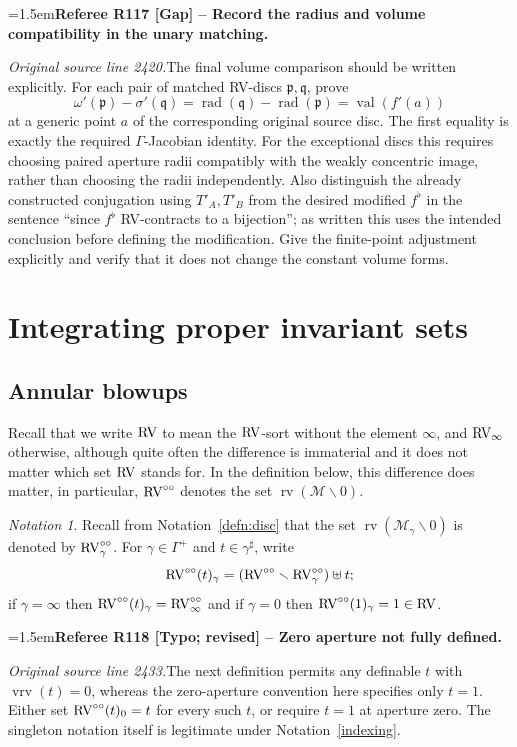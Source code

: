 \documentclass[12pt]{amsart}
\newcommand{\RefereeRemark}[4]{%
  \par\medskip\begingroup\normalfont\small\color{RefereePurple}%
  \emergencystretch=1.5em\noindent\textbf{Referee R#1 [#2] -- #3.}\par\nobreak\noindent #4\par
  \endgroup\medskip
}
\theoremstyle{plain}
\theoremstyle{definition}
\theoremstyle{remark}
\newtheorem{nota}[thm]{Notation}
\numberwithin{equation}{section}
\theoremstyle{plain}
\newcommand{\RV}{\textup{RV}}
\newcommand{\MM}{\mdl M}
\newcommand{\gp}{\mathfrak{p}}
\newcommand{\gq}{\mathfrak{q}}
\newcommand{\0}{\emptyset}
\newcommand{\mdl}[1]{\mathcal{#1}}  %
\newcommand{\mi}{\smallsetminus}
\DeclareMathOperator{\rv}{rv}
\DeclareMathOperator{\vv}{val}
\DeclareMathOperator{\rad}{rad}
\DeclareMathOperator{\vrv}{vrv}
\newcommand{\ccirc}{\circ \circ}
\begin{document}
\RefereeRemark{117}{Gap}{Record the radius and volume compatibility in the unary matching}{%
\textit{Original source line 2420.}\quad The final volume comparison should be written explicitly. For each pair of matched RV-discs $\gp,\gq$, prove
\[
\omega'(\gp)-\sigma'(\gq)
 =\rad(\gq)-\rad(\gp)
 =\vv(f'(a))
\]
at a generic point $a$ of the corresponding original source disc. The first equality is exactly the required $\Gamma$-Jacobian identity. For the exceptional discs this requires choosing paired aperture radii compatibly with the weakly concentric image, rather than choosing the radii independently. Also distinguish the already constructed conjugation using $T'_A,T'_B$ from the desired modified $f^\flat$ in the sentence ``since $f^\flat$ RV-contracts to a bijection''; as written this uses the intended conclusion before defining the modification. Give the finite-point adjustment explicitly and verify that it does not change the constant volume forms.
}

\section{Integrating proper invariant sets}
\label{section:int}

\subsection{Annular blowups}
Recall that we write $\RV$ to mean the $\RV$-sort without the  element $\infty$, and $\RV_\infty$ otherwise, although quite often the difference is immaterial and it does not matter which set $\RV$ stands for. In the definition below, this difference does matter, in particular, $\RV^{\ccirc}$ denotes the set $\rv(\MM \mi 0)$.

\begin{nota}\label{punc:RVd}
Recall from Notation~\ref{defn:disc} that the set $\rv(\MM_{\gamma} \mi 0)$ is denoted by $\RV^{\ccirc}_\gamma$. For $\gamma \in \Gamma^+$ and $t \in \gamma^\sharp$, write
\[
\RV^{\ccirc}(t)_\gamma = (\RV^{\ccirc} \mi \RV^{\ccirc}_\gamma) \uplus t;
\]
if $\gamma = \infty$ then $\RV^{\ccirc}(t)_\gamma = \RV^{\ccirc}_\infty$ and if  $\gamma = 0$ then $\RV^{\ccirc}(1)_\gamma = 1 \in \RV$.

\RefereeRemark{118}{Typo; revised}{Zero aperture not fully defined}{%
\textit{Original source line 2433.}\quad The next definition permits any definable $t$ with $\vrv(t)=0$, whereas the zero-aperture convention here specifies only $t=1$. Either set $\RV^{\ccirc}(t)_0=t$ for every such $t$, or require $t=1$ at aperture zero. The singleton notation itself is legitimate under Notation~\ref{indexing}.
}
\end{nota}
\end{document}
